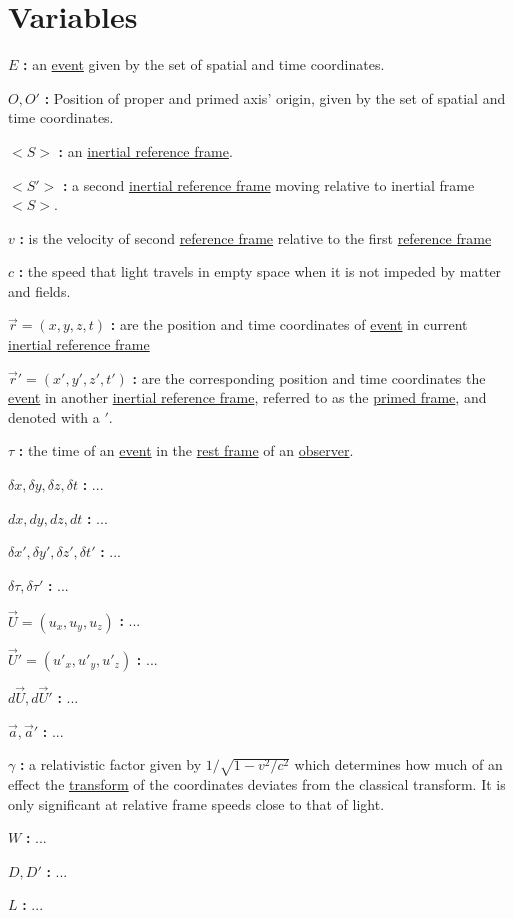 \section{Variables}

\noindent ${E}$ \textbf{:}
an \hyperlink{def-event}{event} given by the set of spatial and time coordinates. %

\noindent ${O},{O'}$ \textbf{:}
Position of proper and primed axis' origin, given by the set of spatial and time coordinates.

\noindent ${<S>}$ \textbf{:}
an \hyperlink{def-Inertial-reference-frame}{inertial reference frame}.

\noindent ${<S'>}$ \textbf{:}
a second \hyperlink{def-Inertial-reference-frame}{inertial reference frame} moving relative to inertial frame ${<S>}$.

\noindent ${v}$ \textbf{:}
is the velocity of second \hyperlink{def-Reference-frame}{reference frame} relative to the first \hyperlink{def-Reference-frame}{reference frame}

\noindent ${c}$ \textbf{:}
the speed that light travels in empty space when it is not impeded by matter and fields.

\noindent ${\vec{r}}=({x},{y},{z},{t})$ \textbf{:}
are the position and time coordinates of \hyperlink{def-event}{event} in current \hyperlink{def-Inertial-reference-frame}{inertial reference frame}

\noindent ${\vec{r}'}=({x'},{y'},{z'},{t'})$ \textbf{:}
are the corresponding position and time coordinates the \hyperlink{def-event}{event} in another \hyperlink{def-Inertial-reference-frame}{inertial reference frame}, referred to as the \hyperlink{def-Primed-Frame}{primed frame}, and denoted with a ${'}$.

\noindent ${\tau}$ \textbf{:}
the time of an \hyperlink{def-event}{event} in the \hyperlink{def-proper-frame}{rest frame} of an \hyperlink{def-observer}{observer}.

\noindent ${\delta x},{\delta y},{\delta z},{\delta t}$ \textbf{:}
...

\noindent ${dx},{dy},{dz},{dt}$ \textbf{:}
...

\noindent ${\delta x'},{\delta y'},{\delta z'},{\delta t'}$ \textbf{:}
...

\noindent ${\delta \tau,\delta \tau'}$ \textbf{:}
...

\noindent ${\vec{U}}=({u_x},{u_y},{u_z})$ \textbf{:}
...

\noindent ${\vec{U}'}=({u'_x},{u'_y},{u'_z})$ \textbf{:}
...

\noindent ${d\vec{U}},{d\vec{U}'}$ \textbf{:}
...

\noindent ${\vec{a}},{\vec{a}'}$ \textbf{:}
...

\noindent ${\gamma}$ \textbf{:}
a relativistic factor given by ${1/\sqrt{1-v^2/c^2}}$ which determines how much of an effect the \hyperlink{def-transform}{transform} of the coordinates deviates from the classical transform. It is only significant at relative frame speeds close to that of light.

\noindent ${W}$ \textbf{:}
...

\noindent ${D},{D'}$ \textbf{:}
...

\noindent ${L}$ \textbf{:}
...
